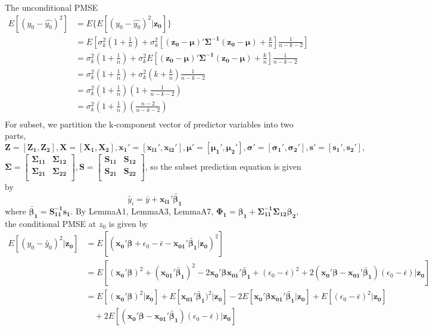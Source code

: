 \documentclass[11pt]{article}
\begin{document}
The unconditional PMSE
$$\begin{aligned}
E[(y_0-\hat{y_0})^2]&=E\{E[(y_0-\hat{y_0})^2|\boldsymbol{z_0}]\}\\
&=E\left[\sigma_k^2\left(1+\frac{1}{n}\right)+\sigma_k^2 \left[\boldsymbol{(z_0-\mu)'\Sigma^{-1}(z_0-\mu)}+\frac{k}{n} \right]\frac{1}{n-k-2}\right]\\
&=\sigma_k^2\left(1+\frac{1}{n}\right)+\sigma_k^2 E\left[\boldsymbol{(z_0-\mu)'\Sigma^{-1}(z_0-\mu)}+\frac{k}{n} \right]\frac{1}{n-k-2}\\
&=\sigma_k^2\left(1+\frac{1}{n}\right)+\sigma_k^2 \left(k+\frac{k}{n} \right)\frac{1}{n-k-2}\\
&=\sigma_k^2\left(1+\frac{1}{n}\right)\left(1+\frac{1}{n-k-2}\right)\\
&=\sigma_k^2\left(1+\frac{1}{n}\right)\left(\frac{n-2}{n-k-2}\right)\\
\end{aligned}
$$
For subset, we partition the k-component vector of predictor variables into two parts, $\boldsymbol{Z=[Z_{1},Z_{2}],X=[X_1,X_2],x_1'=[x_{i1}',x_{i2}'],\mu'=[\mu_1',\mu_2'] ,\sigma'=[\sigma_1',\sigma_2'],s'=[s_1',s_2'],}$ $\boldsymbol{\Sigma=\begin{bmatrix} 
    \Sigma_{11} & \Sigma_{12} \\  
    \Sigma_{21} & \Sigma_{22} \\  
\end{bmatrix},S=\begin{bmatrix} 
    S_{11} & S_{12} \\  
    S_{21} & S_{22} \\  
\end{bmatrix}}$, so the subset prediction equation is given by $$\tilde{y_i}=\bar{y}+\boldsymbol{x_{i1}'\tilde{\beta_1}}$$ where $\boldsymbol{\tilde{\beta_1}=S_{11}^{-1}s_1}$. By LemmaA1, LemmaA3, LemmaA7, $\boldsymbol{\Phi_1=\beta_1+\Sigma^{-1}_{11}\Sigma_{12}\beta_2}$, the conditional PMSE at $z_0$ is given by 
$$
\begin{aligned}
E[(y_0-\tilde{y_0})^2|\boldsymbol{z_0}]
&=E[(\boldsymbol{x_{0}'\beta}+\epsilon_0-\bar{\epsilon}-\boldsymbol{x_{01}'\tilde{\beta_1}}|\boldsymbol{z_0})^2]\\
&= E[(\boldsymbol{x_0'\beta})^2+(\boldsymbol{x_{01}'\tilde{\beta_1}})^2-2\boldsymbol{x_0'\beta x_{01}'\tilde{\beta_1}}+(\epsilon_0-\bar{\epsilon})^2+2(\boldsymbol{x_0'\beta-x_{01}'\tilde{\beta_1}})(\epsilon_0-\bar{\epsilon})|\boldsymbol{z_0}]\\
&= E[(\boldsymbol{x_0'\beta})^2|\boldsymbol{z_0}]+E[\boldsymbol{x_{01}'\tilde{\beta_1}})^2|\boldsymbol{z_0}]-2E[\boldsymbol{x_0'\beta x_{01}'\tilde{\beta_1}|z_0}]+E[(\epsilon_0-\bar{\epsilon})^2|\boldsymbol{z_0}]\\
&\quad+2E[(\boldsymbol{x_0'\beta-x_{01}'\tilde{\beta_1}})(\epsilon_0-\bar{\epsilon})|\boldsymbol{z_0}]
\end{aligned}$$
\end{document}

